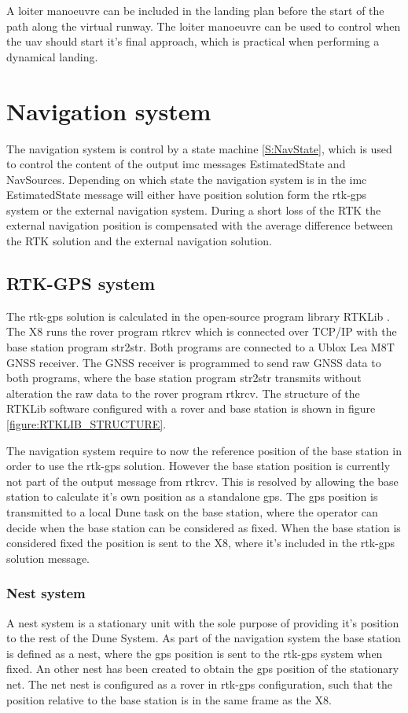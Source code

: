A loiter manoeuvre can be included in the landing plan before the start of the path along the virtual runway. The loiter manoeuvre can be used to control when the \gls{uav} should start it's final approach, which is practical when performing a dynamical landing.
\section{Navigation system}
The navigation system is control by a state machine \ref{S:NavState}, which is used to control the content of the output \gls{imc} messages EstimatedState and NavSources. Depending on which state the navigation system is in the \gls{imc} EstimatedState message will either have position solution form the \gls{rtk-gps} system or the external navigation system. During a short loss of the RTK the external navigation position is compensated with the average difference between the RTK solution and the external navigation solution.
\subsection{RTK-GPS system}
The \gls{rtk-gps} solution is calculated in the open-source program library RTKLib \citep{takasu2009development}.
The X8 runs the rover program rtkrcv which is connected over TCP/IP with the base station program str2str. Both programs are connected to a Ublox Lea M8T GNSS receiver. The GNSS receiver is programmed to send raw GNSS data to both programs, where the base station program str2str transmits without alteration the raw data to the rover program rtkrcv. The structure of the RTKLib software configured with a rover and base station is shown in figure \ref{figure:RTKLIB_STRUCTURE}.

The navigation system require to now the reference position of the base station in order to use the \gls{rtk-gps} solution. However the base station position is currently not part of the output message from rtkrcv. This is resolved by allowing the base station to calculate it's own position as a standalone \gls{gps}. The \gls{gps} position is transmitted to a local Dune task on the base station, where the operator can decide when the base station can be considered as fixed. When the base station is considered fixed the position is sent to the X8, where it's included in the \gls{rtk-gps} solution message.
\subsubsection{Nest system}
A nest system is a stationary unit with the sole purpose of providing it's position to the rest of the Dune System. As part of the navigation system the base station is defined as a nest, where the \gls{gps} position is sent to the \gls{rtk-gps} system when fixed.
An other nest has been created to obtain the \gls{gps} position of the stationary net. The net nest is configured as a rover in \gls{rtk-gps} configuration, such that the position relative to the base station is in the same frame as the X8.
